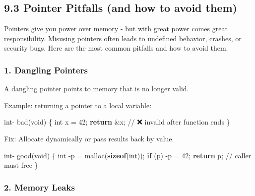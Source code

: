 \documentclass[
  letterpaper,
  DIV=11,
  numbers=noendperiod]{scrreprt}
\newenvironment{Shaded}{\begin{snugshade}}{\end{snugshade}}
\newcommand{\CommentTok}[1]{\textcolor[rgb]{0.37,0.37,0.37}{#1}}
\newcommand{\ControlFlowTok}[1]{\textcolor[rgb]{0.00,0.23,0.31}{\textbf{#1}}}
\newcommand{\DataTypeTok}[1]{\textcolor[rgb]{0.68,0.00,0.00}{#1}}
\newcommand{\DecValTok}[1]{\textcolor[rgb]{0.68,0.00,0.00}{#1}}
\newcommand{\KeywordTok}[1]{\textcolor[rgb]{0.00,0.23,0.31}{\textbf{#1}}}
\newcommand{\NormalTok}[1]{\textcolor[rgb]{0.00,0.23,0.31}{#1}}
\newcommand{\OperatorTok}[1]{\textcolor[rgb]{0.37,0.37,0.37}{#1}}
\begin{document}
\subsection{9.3 Pointer Pitfalls (and how to avoid
them)}\label{pointer-pitfalls-and-how-to-avoid-them}

Pointers give you power over memory - but with great power comes great
responsibility. Misusing pointers often leads to undefined behavior,
crashes, or security bugs. Here are the most common pitfalls and how to
avoid them.

\subsubsection{1. Dangling Pointers}\label{dangling-pointers-1}

A dangling pointer points to memory that is no longer valid.

Example: returning a pointer to a local variable:

\begin{Shaded}
\begin{Highlighting}[]
\DataTypeTok{int}\OperatorTok{{-}}\NormalTok{ bad}\OperatorTok{(}\DataTypeTok{void}\OperatorTok{)} \OperatorTok{\{}
    \DataTypeTok{int}\NormalTok{ x }\OperatorTok{=} \DecValTok{42}\OperatorTok{;}
    \ControlFlowTok{return} \OperatorTok{\&}\NormalTok{x}\OperatorTok{;}   \CommentTok{// ❌ invalid after function ends}
\OperatorTok{\}}
\end{Highlighting}
\end{Shaded}

Fix: Allocate dynamically or pass results back by value.

\begin{Shaded}
\begin{Highlighting}[]
\DataTypeTok{int}\OperatorTok{{-}}\NormalTok{ good}\OperatorTok{(}\DataTypeTok{void}\OperatorTok{)} \OperatorTok{\{}
    \DataTypeTok{int} \OperatorTok{{-}}\NormalTok{p }\OperatorTok{=}\NormalTok{ malloc}\OperatorTok{(}\KeywordTok{sizeof}\OperatorTok{(}\DataTypeTok{int}\OperatorTok{));}
    \ControlFlowTok{if} \OperatorTok{(}\NormalTok{p}\OperatorTok{)} \OperatorTok{{-}}\NormalTok{p }\OperatorTok{=} \DecValTok{42}\OperatorTok{;}
    \ControlFlowTok{return}\NormalTok{ p}\OperatorTok{;}   \CommentTok{// caller must free}
\OperatorTok{\}}
\end{Highlighting}
\end{Shaded}

\subsubsection{2. Memory Leaks}\label{memory-leaks}
\end{document}
